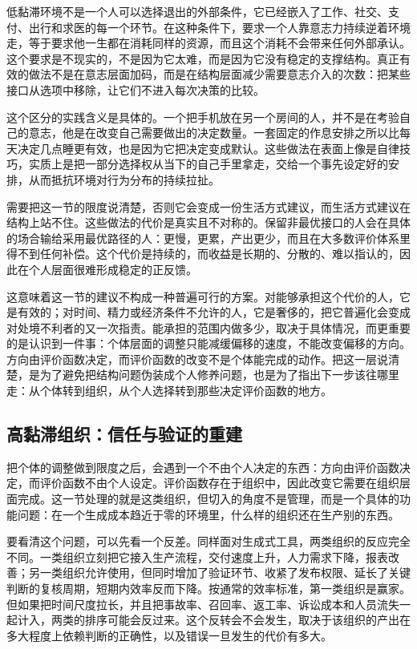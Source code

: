 低黏滞环境不是一个人可以选择退出的外部条件，它已经嵌入了工作、社交、支付、出行和求医的每一个环节。在这种条件下，要求一个人靠意志力持续逆着环境走，等于要求他一生都在消耗同样的资源，而且这个消耗不会带来任何外部承认。这个要求是不现实的，不是因为它太难，而是因为它没有稳定的支撑结构。真正有效的做法不是在意志层面加码，而是在结构层面减少需要意志介入的次数：把某些接口从选项中移除，让它们不进入每次决策的比较。

这个区分的实践含义是具体的。一个把手机放在另一个房间的人，并不是在考验自己的意志，他是在改变自己需要做出的决定数量。一套固定的作息安排之所以比每天决定几点睡更有效，也是因为它把决定变成默认。这些做法在表面上像是自律技巧，实质上是把一部分选择权从当下的自己手里拿走，交给一个事先设定好的安排，从而抵抗环境对行为分布的持续拉扯。


需要把这一节的限度说清楚，否则它会变成一份生活方式建议，而生活方式建议在结构上站不住。这些做法的代价是真实且不对称的。保留非最优接口的人会在具体的场合输给采用最优路径的人：更慢，更累，产出更少，而且在大多数评价体系里得不到任何补偿。这个代价是持续的，而收益是长期的、分散的、难以指认的，因此在个人层面很难形成稳定的正反馈。

这意味着这一节的建议不构成一种普遍可行的方案。对能够承担这个代价的人，它是有效的；对时间、精力或经济条件不允许的人，它是奢侈的，把它普遍化会变成对处境不利者的又一次指责。能承担的范围内做多少，取决于具体情况，而更重要的是认识到一件事：个体层面的调整只能减缓偏移的速度，不能改变偏移的方向。方向由评价函数决定，而评价函数的改变不是个体能完成的动作。把这一层说清楚，是为了避免把结构问题伪装成个人修养问题，也是为了指出下一步该往哪里走：从个体转到组织，从个人选择转到那些决定评价函数的地方。

\subsection{高黏滞组织：信任与验证的重建}


把个体的调整做到限度之后，会遇到一个不由个人决定的东西：方向由评价函数决定，而评价函数不由个人设定。评价函数存在于组织中，因此改变它需要在组织层面完成。这一节处理的就是这类组织，但切入的角度不是管理，而是一个具体的功能问题：在一个生成成本趋近于零的环境里，什么样的组织还在生产别的东西。

要看清这个问题，可以先看一个反差。同样面对生成式工具，两类组织的反应完全不同。一类组织立刻把它接入生产流程，交付速度上升，人力需求下降，报表改善；另一类组织允许使用，但同时增加了验证环节、收紧了发布权限、延长了关键判断的复核周期，短期内效率反而下降。按通常的效率标准，第一类组织是赢家。但如果把时间尺度拉长，并且把事故率、召回率、返工率、诉讼成本和人员流失一起计入，两类的排序可能会反过来。这个反转会不会发生，取决于该组织的产出在多大程度上依赖判断的正确性，以及错误一旦发生的代价有多大。

